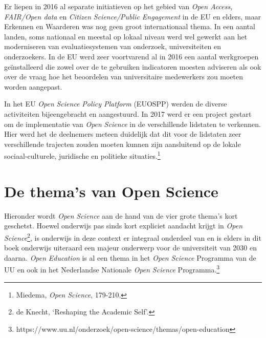 \documentclass[smallauthor, chapterhaspagenum, nochapterinheader, pagenuminheader,  bigchapnum,medium2, tocpages, garamond, titleinheader]{jote-book}
\begin{document}
	Er liepen in 2016 al separate initiatieven op het gebied van \emph{Open Access},\emph{ FAIR/Open data} en \emph{Citizen}\emph{ }\emph{Science}\emph{/Public Engagement} in de EU en elders, maar Erkennen en Waarderen was nog geen groot internationaal thema. In een aantal landen, soms nationaal en meestal op lokaal niveau werd wel gewerkt aan het moderniseren van evaluatiesystemen van onderzoek, universiteiten en onderzoekers. In de EU werd zeer voortvarend al in 2016 een aantal werkgroepen geïnstalleerd die zowel over de te gebruiken indicatoren moesten adviseren als ook over de vraag hoe het beoordelen van universitaire medewerkers zou moeten worden aangepast.



	In het EU \emph{Open }\emph{Science} \emph{Policy Platform} (EUOSPP) werden de diverse activiteiten bijeengebracht en aangestuurd. In 2017 werd er een project gestart om de implementatie van \emph{Open }\emph{Science} in de verschillende lidstaten te verkennen. Hier werd het de deelnemers meteen duidelijk dat dit voor de lidstaten zeer verschillende trajecten zouden moeten kunnen zijn aansluitend op de lokale sociaal-culturele, juridische en politieke situaties.\footnote{Miedema, \emph{Open }\emph{Science}, 179-210.}



	\section{De thema's van Open Science}



	Hieronder wordt \emph{Open }\emph{Science} aan de hand van de vier grote thema's kort geschetst. Hoewel onderwijs pas sinds kort expliciet aandacht krijgt in \emph{Open }\emph{Science}\footnote{de Knecht, ‘Reshaping the Academic Self'.}, is onderwijs in deze context er integraal onderdeel van en is elders in dit boek onderwijs uiteraard een majeur onderwerp voor de universiteit van 2030 en daarna. \emph{Open }\emph{Education} is al een thema in het \emph{Open }\emph{Science} Programma van de UU en ook in het Nederlandse Nationale \emph{Open }\emph{Science} Programma.\footnote{https://www.uu.nl/onderzoek/open-science/themas/open-education}
\end{document}
